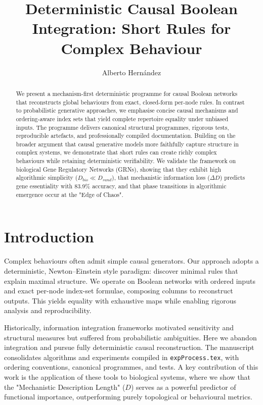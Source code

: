 \documentclass[11pt]{article}
\title{Deterministic Causal Boolean Integration: Short Rules for Complex Behaviour}
\author{Alberto Hern\'andez}
\date{}
\begin{document}
\maketitle

\begin{abstract}
We present a mechanism-first deterministic programme for causal Boolean networks that reconstructs global behaviours from exact, closed-form per-node rules. In contrast to probabilistic generative approaches, we emphasise concise causal mechanisms and ordering-aware index sets that yield complete repertoire equality under unbiased inputs. The programme delivers canonical structural programmes, rigorous tests, reproducible artefacts, and professionally compiled documentation. Building on the broader argument that causal generative models more faithfully capture structure in complex systems, we demonstrate that short rules can create richly complex behaviours while retaining deterministic verifiability. We validate the framework on biological Gene Regulatory Networks (GRNs), showing that they exhibit high algorithmic simplicity ($D_{bio} \ll D_{rand}$), that mechanistic information loss ($\Delta D$) predicts gene essentiality with 83.9\% accuracy, and that phase transitions in algorithmic emergence occur at the "Edge of Chaos".

\end{abstract}

\section{Introduction}
Complex behaviours often admit simple causal generators. Our approach adopts a deterministic, Newton--Einstein style paradigm: discover minimal rules that explain maximal structure. We operate on Boolean networks with ordered inputs and exact per-node index-set formulae, composing columns to reconstruct outputs. This yields equality with exhaustive maps while enabling rigorous analysis and reproducibility.

Historically, information integration frameworks motivated sensitivity and structural measures but suffered from probabilistic ambiguities. Here we abandon integration and pursue fully deterministic causal reconstruction. The manuscript consolidates algorithms and experiments compiled in \texttt{expProcess.tex}, with ordering conventions, canonical programmes, and tests. A key contribution of this work is the application of these tools to biological systems, where we show that the "Mechanistic Description Length" ($D$) serves as a powerful predictor of functional importance, outperforming purely topological or behavioural metrics.
\end{document}
